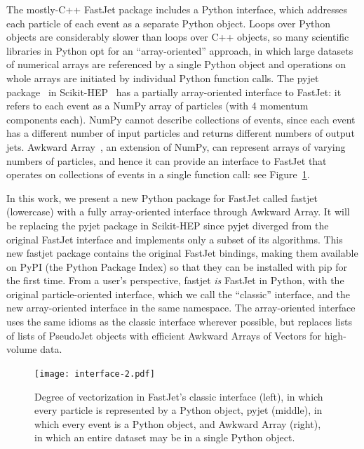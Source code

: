 \documentclass[a4paper]{jpconf}
\begin{document}
The mostly-C++ FastJet package includes a Python interface, which addresses each particle of each event as a separate Python object. Loops over Python objects are considerably slower than loops over C++ objects, so many scientific libraries in Python opt for an ``array-oriented'' approach, in which large datasets of numerical arrays are referenced by a single Python object and operations on whole arrays are initiated by individual Python function calls. The pyjet package~\cite{noel_dawe_2021_4446849} in Scikit-HEP~\cite{refId0} has a partially array-oriented interface to FastJet: it refers to each event as a NumPy array of particles (with 4 momentum components each). NumPy cannot describe collections of events, since each event has a different number of input particles and returns different numbers of output jets. Awkward Array~\cite{Pivarski_Awkward_Array_2018}, an extension of NumPy, can represent arrays of varying numbers of particles, and hence it can provide an interface to FastJet that operates on collections of events in a single function call: see Figure~\ref{fig:vec}.

In this work, we present a new Python package for FastJet called fastjet (lowercase) with a fully array-oriented interface through Awkward Array. It will be replacing the pyjet package in Scikit-HEP since pyjet diverged from the original FastJet interface and implements only a subset of its algorithms. This new fastjet package contains the original FastJet bindings, making them available on PyPI (the Python Package Index) so that they can be installed with pip for the first time. From a user's perspective, fastjet {\it is} FastJet in Python, with the original particle-oriented interface, which we call the ``classic'' interface, and the new array-oriented interface in the same namespace. The array-oriented interface uses the same idioms as the classic interface wherever possible, but replaces lists of lists of PseudoJet objects with efficient Awkward Arrays of Vectors for high-volume data.

\begin{figure}
\begin{minipage}{39pc}
\begin{center} 
\texttt{[image: interface-2.pdf]}
\caption{\label{fig:vec}Degree of vectorization in FastJet's classic interface (left), in which every particle is represented by a Python object, pyjet (middle), in which every event is a Python object, and Awkward Array (right), in which an entire dataset may be in a single Python object.}
\end{center}
\end{minipage}\hspace{2pc}%
\end{figure}
\end{document}
